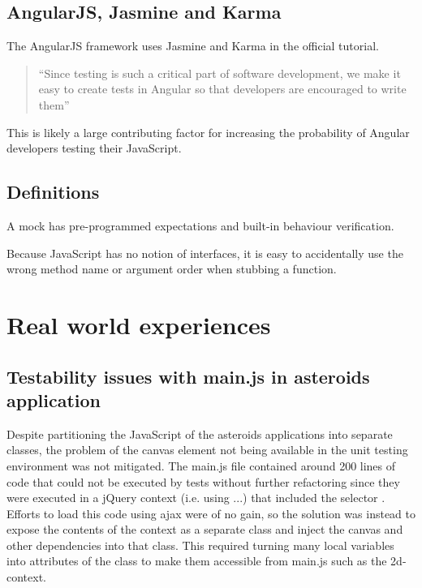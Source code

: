 \documentclass[11pt]{article}
\begin{document}
\subsection{AngularJS, Jasmine and Karma}

The AngularJS framework uses Jasmine and Karma in the official tutorial.

\begin{quote}
``Since testing is such a critical part of software development, we make it easy to create tests in Angular so that developers are encouraged to write them''\cite{AngularTemplates}
\end{quote}

This is likely a large contributing factor for increasing the probability of Angular developers testing their JavaScript.

\subsection{Definitions}

A mock has pre-programmed expectations and built-in behaviour verification\cite[p.~453]{Tddjs}.

Because JavaScript has no notion of interfaces, it is easy to accidentally use the wrong method name or argument order when stubbing a function\cite[p.~471]{Tddjs}.

\section{Real world experiences}

\subsection{Testability issues with main.js in asteroids application}

Despite partitioning the JavaScript of the asteroids applications into separate classes, the problem of the canvas element not being available in the unit testing environment was not mitigated. The main.js file contained around 200 lines of code that could not be executed by tests without further refactoring since they were executed in a jQuery context (i.e. using \jquerycontext...) that included the selector \selector. Efforts to load this code using ajax were of no gain, so the solution was instead to expose the contents of the context as a separate class and inject the canvas and other dependencies into that class. This required turning many local variables into attributes of the class to make them accessible from main.js such as the 2d-context.
\end{document}
